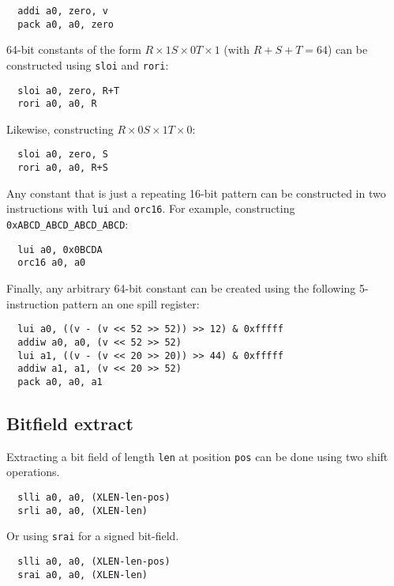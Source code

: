 \begin{verbatim}
  addi a0, zero, v
  pack a0, a0, zero
\end{verbatim}

64-bit constants of the form $R\times1 S\times0 T\times1$ (with $R+S+T=64$)
can be constructed using {\tt sloi} and {\tt rori}:

\begin{verbatim}
  sloi a0, zero, R+T
  rori a0, a0, R
\end{verbatim}

Likewise, constructing $R\times0 S\times1 T\times0$:

\begin{verbatim}
  sloi a0, zero, S
  rori a0, a0, R+S
\end{verbatim}

Any constant that is just a repeating 16-bit pattern can be constructed
in two instructions with {\tt lui} and {\tt orc16}. For example,
constructing {\tt 0xABCD\_ABCD\_ABCD\_ABCD}:

\begin{verbatim}
  lui a0, 0x0BCDA
  orc16 a0, a0
\end{verbatim}

Finally, any arbitrary 64-bit constant can be created using the following
5-instruction pattern an one spill register:

\begin{verbatim}
  lui a0, ((v - (v << 52 >> 52)) >> 12) & 0xfffff
  addiw a0, a0, (v << 52 >> 52)
  lui a1, ((v - (v << 20 >> 20)) >> 44) & 0xfffff
  addiw a1, a1, (v << 20 >> 52)
  pack a0, a0, a1
\end{verbatim}


\subsection{Bitfield extract}

Extracting a bit field of length {\tt len} at position {\tt pos} can be done using
two shift operations.

\begin{verbatim}
  slli a0, a0, (XLEN-len-pos)
  srli a0, a0, (XLEN-len)
\end{verbatim}

Or using {\tt srai} for a signed bit-field.

\begin{verbatim}
  slli a0, a0, (XLEN-len-pos)
  srai a0, a0, (XLEN-len)
\end{verbatim}

